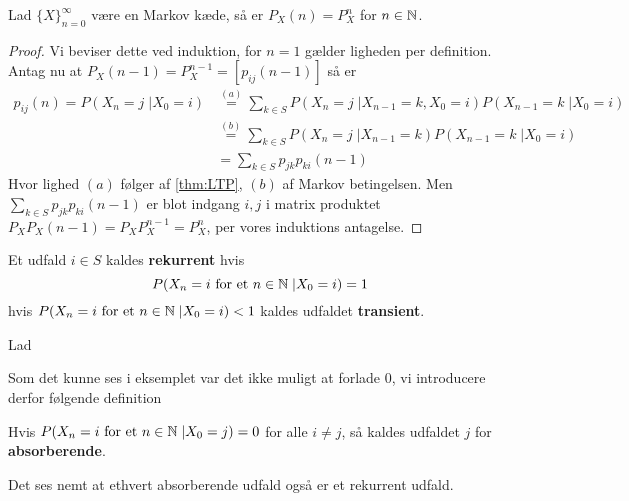 \begin{example}

\end{example}


\begin{thm}
Lad $\{X\}_{n = 0}^\infty$ være en Markov kæde, så er $P_X(n) = P_X^n$ for $n \in \mathbb{N}$.
\end{thm}
\begin{proof}
Vi beviser dette ved induktion, for $n = 1$ gælder ligheden per definition. Antag nu at $P_X(n - 1) = P_X^{n - 1} = [p_{ij}(n - 1)]$ så er 
\begin{align*} 
    p_{ij}(n) = P(X_n = j \;| X_0 = i) &\stackrel{(a)}= \sum_{k \in S} P(X_n = j\; | X_{n - 1} = k, X_0 = i) P(X_{n - 1} = k\; | X_0 = i) \\
    &\stackrel{(b)}= \sum_{k \in S} P(X_n = j\; | X_{n - 1} = k) P(X_{n - 1} = k\; | X_0 = i) \\
    &= \sum_{k \in S} p_{jk}p_{ki}(n - 1) 
\end{align*}
Hvor lighed $(a)$ følger af \ref{thm:LTP}, $(b)$ af Markov betingelsen. Men $\displaystyle \sum_{k \in S} p_{jk}p_{ki}(n - 1)$ er blot indgang $i, j$ i matrix produktet $P_X P_X(n - 1) = P_X P_X^{n - 1} = P_X^n$, per vores induktions antagelse.
\end{proof}

\begin{defn}
Et udfald $i \in S$ kaldes \textbf{rekurrent} hvis 
\begin{equation*}
    P(X_n = i \text{ for et } n \in \mathbb{N} \;| X_0 = i) = 1
\end{equation*}
hvis $P(X_n = i \text{ for et } n \in \mathbb{N} \;| X_0 = i) < 1$ kaldes udfaldet \textbf{transient}.
\end{defn}

\begin{example}
  Lad
\end{example}

Som det kunne ses i eksemplet var det ikke muligt at forlade $0$, vi introducere derfor følgende definition
\begin{definition}
Hvis $P(X_{n} = i \text{ for et } n \in \mathbb{N} \;| X_{0} = j) = 0$ for alle $i \neq j$, så kaldes udfaldet $j$ for \textbf{absorberende}.
\end{definition}
\begin{example}
  Det ses nemt at ethvert absorberende udfald også er et rekurrent udfald.
\end{example}



